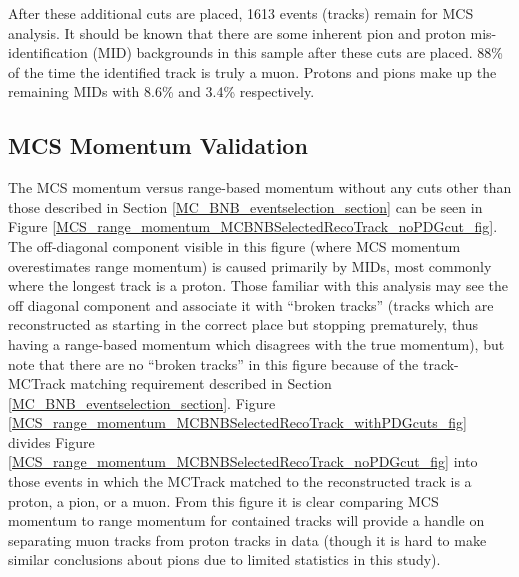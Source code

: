 After these additional cuts are placed, 1613 events (tracks) remain for MCS analysis. It should be known that there are some inherent pion and proton mis-identification (MID) backgrounds in this sample after these cuts are placed. 88\% of the time the identified track is truly a muon. Protons and pions make up the remaining MIDs with 8.6\% and 3.4\% respectively.




\subsection{MCS Momentum Validation}\label{MCS_Momentum_Validation_MCBNBSelectedRecoTrack_section}
The MCS momentum versus range-based momentum without any cuts other than those described in Section \ref{MC_BNB_eventselection_section} can be seen in Figure \ref{MCS_range_momentum_MCBNBSelectedRecoTrack_noPDGcut_fig}. The off-diagonal component visible in this figure (where MCS momentum overestimates range momentum) is caused primarily by MIDs, most commonly where the longest track is a proton. Those familiar with this analysis may see the off diagonal component and associate it with ``broken tracks'' (tracks which are reconstructed as starting in the correct place but stopping prematurely, thus having a range-based momentum which disagrees with the true momentum), but note that there are no ``broken tracks'' in this figure because of the track-{\sc MCTrack} matching requirement described in Section \ref{MC_BNB_eventselection_section}. Figure \ref{MCS_range_momentum_MCBNBSelectedRecoTrack_withPDGcuts_fig} divides Figure \ref{MCS_range_momentum_MCBNBSelectedRecoTrack_noPDGcut_fig} into those events in which the MCTrack matched to the reconstructed track is a proton, a pion, or a muon. From this figure it is clear comparing MCS momentum to range momentum for contained tracks will provide a handle on separating muon tracks from proton tracks in data (though it is hard to make similar conclusions about pions due to limited statistics in this study).\\


